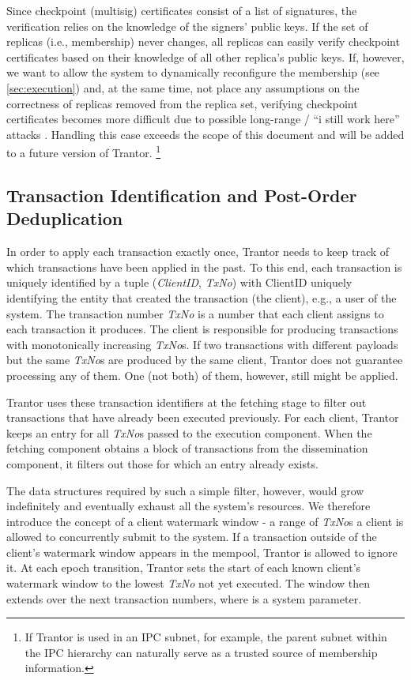 \documentclass{article}
\begin{document}
Since checkpoint (multisig) certificates consist of a list of signatures, the verification relies on the knowledge of the signers’ public keys.
If the set of replicas (i.e., membership) never changes, all replicas can easily verify checkpoint certificates
based on their knowledge of all other replica’s public keys.
If, however, we want to allow the system to dynamically reconfigure the membership (see \cref{sec:execution})
and, at the same time, not place any assumptions on the correctness of replicas removed from the replica set,
verifying checkpoint certificates becomes more difficult due to possible long-range / ``i still work here'' attacks \cite{longrangeattacks}.
Handling this case exceeds the scope of this document and will be added to a future version of Trantor.%
\footnote{If Trantor is used in an IPC \cite{ipc} subnet, for example, the parent subnet within the IPC hierarchy can naturally serve as a trusted source of membership information.}

\subsection{Transaction Identification and Post-Order Deduplication}
\label{sec:tx-deduplication}

In order to apply each transaction exactly once, Trantor needs to keep track of which transactions have been applied in the past.
To this end, each transaction is uniquely identified by a tuple (\textit{ClientID}, \textit{TxNo})
with ClientID uniquely identifying the entity that created the transaction (the client), e.g., a user of the system.
The transaction number \textit{TxNo} is a number that each client assigns to each transaction it produces.
The client is responsible for producing transactions with monotonically increasing \textit{TxNo}s.
If two transactions with different payloads but the same \textit{TxNo}s are produced by the same client,
Trantor does not guarantee processing any of them.
One (not both) of them, however, still might be applied.

Trantor uses these transaction identifiers at the fetching stage to filter out transactions that have already been executed previously.
For each client, Trantor keeps an entry for all \textit{TxNo}s passed to the execution component.
When the fetching component obtains a block of transactions from the dissemination component, it filters out those for which an entry already exists.

The data structures required by such a simple filter, however, would grow indefinitely and eventually exhaust all the system’s resources.
We therefore introduce the concept of a client watermark window - a range of \textit{TxNo}s a client is allowed to concurrently submit to the system.
If a transaction outside of the client’s watermark window appears in the mempool, Trantor is allowed to ignore it.
At each epoch transition, Trantor sets the start of each known client’s watermark window to the lowest \textit{TxNo} not yet executed.
The window then extends over the next  transaction numbers, where  is a system parameter.
\end{document}
